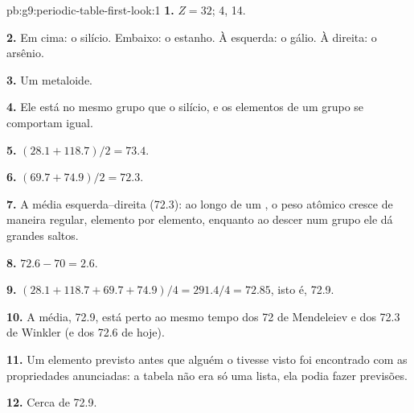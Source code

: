 \begin{solution}{pb:g9:periodic-table-first-look:1}
\textbf{1.} $Z = 32$;  4,  14.

\textbf{2.} Em cima: o silício. Embaixo: o estanho. À esquerda: o gálio.
À direita: o arsênio.

\textbf{3.} Um metaloide.

\textbf{4.} Ele está no mesmo grupo que o silício, e os elementos de um
grupo se comportam igual.

\textbf{5.} $(28.1 + 118.7)/2 = 73.4$.

\textbf{6.} $(69.7 + 74.9)/2 = 72.3$.

\textbf{7.} A média esquerda--direita (72.3): ao longo de um , o
peso atômico cresce de maneira regular, elemento por elemento, enquanto
ao descer num grupo ele dá grandes saltos.

\textbf{8.} $72.6 - 70 = 2.6$.

\textbf{9.} $(28.1 + 118.7 + 69.7 + 74.9)/4 = 291.4/4 = 72.85$, isto é,
72.9.

\textbf{10.} A média, 72.9, está perto ao mesmo tempo dos 72 de
Mendeleiev e dos 72.3 de Winkler (e dos 72.6 de hoje).

\textbf{11.} Um elemento previsto antes que alguém o tivesse visto foi
encontrado com as propriedades anunciadas: a tabela não era só uma
lista, ela podia fazer previsões.

\textbf{12.} Cerca de 72.9.
\end{solution}
